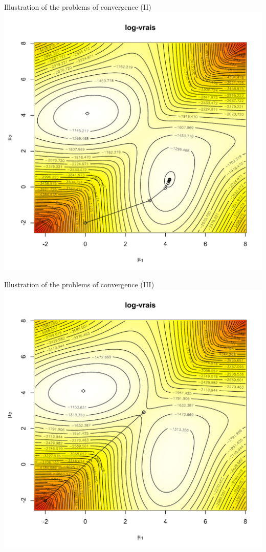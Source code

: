 \documentclass[compress,10pt]{beamer}
\begin{document}
\begin{frame}{Illustration of the problems of convergence (II)}
\centering
\includegraphics[width = 0.7 \textwidth]{figure-data_sim-logvrais-init2}
\end{frame}
\begin{frame}{Illustration of the problems of convergence (III)}
\centering
\includegraphics[width = 0.7 \textwidth]{figure-data_sim-logvrais-init3}
\end{frame}
 
\end{document}
